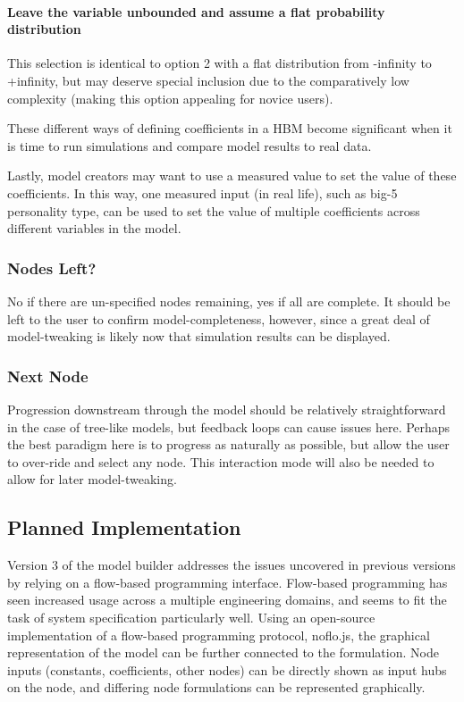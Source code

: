 \documentclass[conference]{IEEEtran}
\begin{document}
\paragraph{ Leave the variable unbounded and assume a flat probability distribution}
This selection is identical to option 2 with a flat distribution from -infinity to +infinity, but may deserve special inclusion due to the comparatively low complexity (making this option appealing for novice users).


These different ways of defining coefficients in a HBM become significant when it is time to run simulations and compare model results to real data. 

Lastly, model creators may want to use a measured value to set the value of these coefficients. In this way, one measured input (in real life), such as big-5 personality type, can be used to set the value of multiple coefficients across different variables in the model.


\subsubsection{Nodes Left?}
No if there are un-specified nodes remaining, yes if all are complete. 
It should be left to the user to confirm model-completeness, however, since a great deal of model-tweaking is likely now that simulation results can be displayed.

\subsubsection{Next Node}
Progression downstream through the model should be relatively straightforward in the case of tree-like models, but feedback loops can cause issues here. 
Perhaps the best paradigm here is to progress as naturally as possible, but allow the user to over-ride and select any node. 
This interaction mode will also be needed to allow for later model-tweaking. 

\subsection{Planned Implementation}
Version 3 of the model builder addresses the issues uncovered in previous versions by relying on a flow-based programming interface.
Flow-based programming has seen increased usage across a multiple engineering domains, and seems to fit the task of system specification particularly well.
Using an open-source implementation of a flow-based programming protocol, noflo.js, the graphical representation of the model can be further connected to the formulation.  %
Node inputs (constants, coefficients, other nodes) can be directly shown as input hubs on the node, and differing node formulations can be represented graphically.
\end{document}
